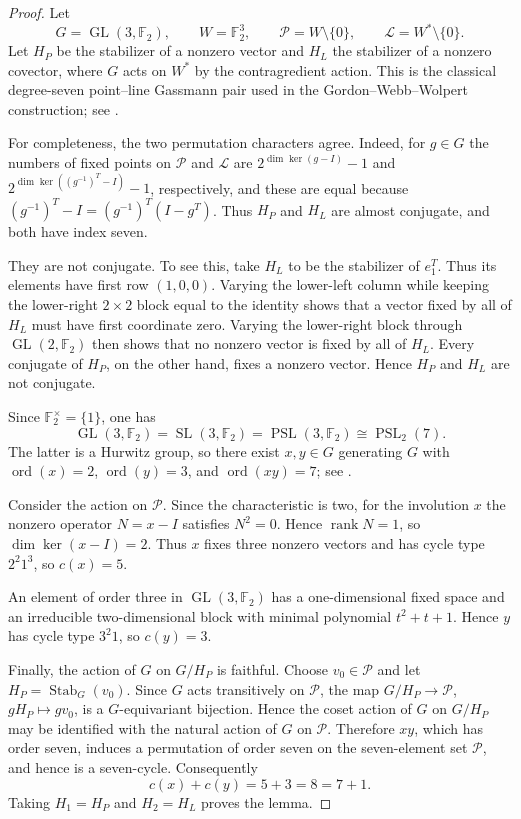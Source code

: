 \documentclass[11pt,letterpaper,reqno]{amsart}
\theoremstyle{definition}
\newcommand{\Ftwo}{\mathbb F_2}
\begin{document}
\begin{proof}
Let
\[
G=\operatorname{GL}(3,\Ftwo),\qquad
W=\Ftwo^3,\qquad
\mathcal P=W\setminus\{0\},\qquad
\mathcal L=W^*\setminus\{0\}.
\]
Let $H_P$ be the stabilizer of a nonzero vector and $H_L$ the
stabilizer of a nonzero covector, where $G$ acts on $W^*$ by the
contragredient action.  This is the classical degree-seven
point--line Gassmann pair used in the Gordon--Webb--Wolpert
construction; see \cite[Sec.~3.3]{GordonWebbWolpert1992}.

For completeness, the two permutation characters agree. Indeed,
for $g\in G$ the numbers of fixed points on $\mathcal P$ and
$\mathcal L$ are $2^{\dim\ker(g-I)}-1$ and $2^{\dim\ker((g^{-1})^T-I)}-1$, respectively, and these are equal because $(g^{-1})^T-I=(g^{-1})^T(I-g^T)$. Thus $H_P$ and $H_L$ are almost conjugate, and both have index seven.

They are not conjugate.  To see this, take $H_L$ to be the stabilizer
of $e_1^T$.  Thus its elements have first row $(1,0,0)$.  Varying the
lower-left column while keeping the lower-right $2\times2$ block
equal to the identity shows that a vector fixed by all of $H_L$ must
have first coordinate zero.  Varying the lower-right block through
$\operatorname{GL}(2,\Ftwo)$ then shows that no nonzero vector is
fixed by all of $H_L$.  Every conjugate of $H_P$, on the other hand,
fixes a nonzero vector.  Hence $H_P$ and $H_L$ are not conjugate.

Since $\Ftwo^\times=\{1\}$, one has
\[
\operatorname{GL}(3,\Ftwo)
=
\operatorname{SL}(3,\Ftwo)
=
\operatorname{PSL}(3,\Ftwo)
\cong\operatorname{PSL}_2(7).
\]
The latter is a Hurwitz group, so there exist $x,y\in G$ generating
$G$ with $\operatorname{ord}(x)=2$, $\operatorname{ord}(y)=3$, and
$\operatorname{ord}(xy)=7$; see
\cite{LucchiniTamburiniWilson2000}.

Consider the action on $\mathcal P$.  Since the characteristic is
two, for the involution $x$ the nonzero operator $N=x-I$ satisfies
$N^2=0$.  Hence $\operatorname{rank}N=1$, so
$\dim\ker(x-I)=2$.  Thus $x$ fixes three nonzero vectors and has
cycle type $2^2 1^3$, so $c(x)=5$.

An element of order three in $\operatorname{GL}(3,\Ftwo)$ has a
one-dimensional fixed space and an irreducible two-dimensional block
with minimal polynomial $t^2+t+1$.  Hence $y$ has cycle type $3^2 1$, so $c(y)=3$.

Finally, the action of $G$ on $G/H_{P}$ is faithful. Choose $v_0\in\mathcal P$ and let $H_P=\operatorname{Stab}_G(v_0)$. Since $G$ acts transitively on $\mathcal P$, the map $G/H_P\to\mathcal P$, $gH_P\mapsto gv_0$, is a $G$-equivariant bijection. Hence the coset action of $G$ on $G/H_P$ may be identified with the natural action of $G$ on $\mathcal P$. Therefore
$xy$, which has order seven, induces a permutation of order seven on
the seven-element set $\mathcal P$, and hence is a seven-cycle.
Consequently
\[
c(x)+c(y)=5+3=8=7+1.
\]
Taking $H_1=H_P$ and $H_2=H_L$ proves the lemma.
\end{proof}
\end{document}
